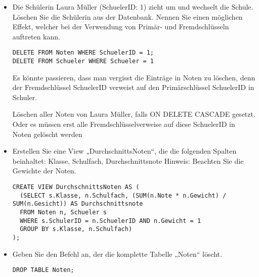 \documentclass{lehramt-informatik-aufgabe}
\begin{document}
\begin{enumerate}
\begin{itemize}
\item Die Schülerin Laura Müller (SchuelerID: 1) zieht um und wechselt
die Schule. Löschen Sie die Schülerin aus der Datenbank. Nennen Sie
einen möglichen Effekt, welcher bei der Verwendung von Primär- und
Fremdschlüsseln auftreten kann.

\begin{antwort}[richtig]
\begin{verbatim}
DELETE FROM Noten WHERE SchuelerID = 1;
DELETE FROM Schueler WHERE Schueler = 1
\end{verbatim}

Es könnte passieren, dass man vergisst die Einträge in Noten zu löschen,
denn der Fremdschlüssel SchuelerID verweist auf den Primärschlüssel
SchuelerID in Schuler.
\end{antwort}

\begin{antwort}[muster]
Löschen aller Noten von Laura Müller, falls ON DELETE CASCADE gesetzt.
Oder es müssen erst alle Fremdschlüsselverweise auf diese SchuelerID in
Noten gelöscht werden
\end{antwort}

\item Erstellen Sie eine View „DurchschnittsNoten“, die die folgenden
Spalten beinhaltet: Klasse, Schulfach, Durchschnittsnote Hinweis:
Beachten Sie die Gewichte der Noten.

\begin{antwort}[muster]
\begin{verbatim}
CREATE VIEW DurchschnittsNoten AS (
  (SELECT s.Klasse, n.Schulfach, (SUM(n.Note * n.Gewicht) / SUM(n.Gesicht)) AS Durchschnittsnote
  FROM Noten n, Schueler s
  WHERE s.SchulerID = n.SchuelerID AND n.Gewicht = 1
  GROUP BY s.Klasse, n.Schulfach)
);
\end{verbatim}
\end{antwort}

\item Geben Sie den Befehl an, der die komplette Tabelle „Noten“ löscht.

\begin{antwort}[muster]
\begin{verbatim}
DROP TABLE Noten;
\end{verbatim}
\end{antwort}

\end{itemize}



\end{enumerate}
\end{document}
